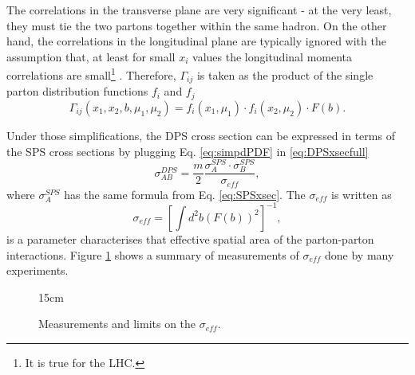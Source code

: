 The correlations in the transverse plane are very significant - at the very least, they must tie the two partons together within the same hadron. On the other hand, the correlations in the longitudinal plane are typically ignored with the assumption that, at least for small $x_i$ values the longitudinal momenta correlations are small\footnote{It is true for the LHC.} \cite{gaunt2010double}. Therefore, $\Gamma_{ij}$ is taken as the product of the single parton distribution functions $f_i$ and $f_j$
\begin{equation}\label{eq:simpdPDF}
    \Gamma_{ij}(x_1, x_2, b, \mu_1, \mu_2) = f_i(x_1, \mu_1) \cdot f_i(x_2, \mu_2) \cdot F(b).
\end{equation}

Under those simplifications, the DPS cross section can be expressed in terms of the SPS cross sections by plugging Eq. \ref{eq:simpdPDF} in \ref{eq:DPSxsecfull}
\begin{equation}
    \sigma_{AB}^{DPS} = \frac{m}{2} \frac{\sigma_A^{SPS} \cdot \sigma_B^{SPS}}{\sigma_{eff}},
\end{equation}
where $\sigma^{SPS}_A$ has the same formula from Eq. \ref{eq:SPSxsec}. The $\sigma_{eff}$ is written as
\begin{equation}\label{eq:sigmaeff}
    \sigma_{eff} = \left[ \int d^2b (F(b))^2 \right]^{-1},
\end{equation}
is a parameter characterises that effective spatial area of the parton-parton interactions. Figure \ref{fig:sigmaeff_measurements} shows a summary of measurements of $\sigma_{eff}$ done by many experiments.

\begin{figure}[!htm]{15cm} %
\caption{Measurements and limits on the $\sigma_{eff}$.}%
\label{fig:sigmaeff_measurements}
\end{figure}

